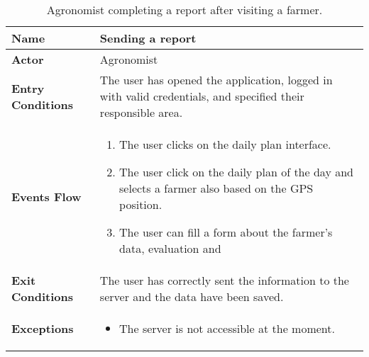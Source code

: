 \begin{table}[hbt!]
\centering
\small
\caption{\label{tab:agrReport}Agronomist completing a report after visiting a farmer.}

\renewcommand{\arraystretch}{1.25}
\begin{tabular}{|l|>{\raggedright\arraybackslash}m{12cm}|}
    \hline
    \textbf{Name} & Sending a report\\
    \hline
   	\textbf{Actor} & Agronomist\\
    \hline
    \textbf{Entry Conditions} & The user has opened the application, logged in with valid credentials, and specified their responsible area.\\    
    \hline
    \textbf{Events Flow} & 
    	\begin{enumerate}
            \item The user clicks on the daily plan interface.
            \item The user click on the daily plan of the day and selects a farmer also based on the GPS position.
            \item The user can fill a form about the farmer's data, evaluation and 
       \end{enumerate}\\
    \hline
    \textbf{Exit Conditions} & The user has correctly sent the information to the server and the data have been saved.\\
    \hline
    \textbf{Exceptions} & 
    	\begin{itemize}
	    	\item The server is not accessible at the moment.
    	\end{itemize}\\
    \hline 
\end{tabular}
\end{table}
